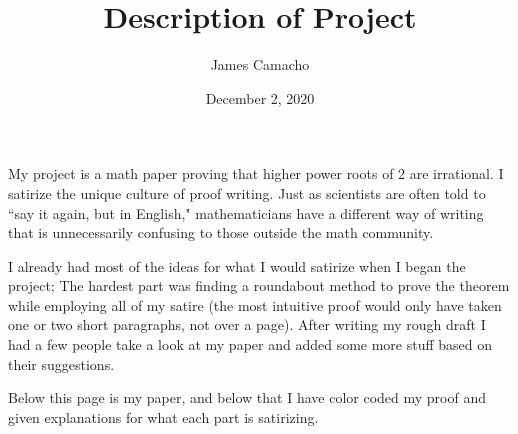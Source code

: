 \documentclass{article}
\author{James Camacho}
\title{Description of Project}
\date{December 2, 2020}
\begin{document}
	\maketitle
	\par
	My project is a math paper proving that higher power roots of $2$ are irrational. I satirize the unique culture of proof writing. Just as scientists are often told to ``say it again, but in English," mathematicians have a different way of writing that is unnecessarily confusing to those outside the math community.
	\par
	I already had most of the ideas for what I would satirize when I began the project; The hardest part was finding a roundabout method to prove the theorem while employing all of my satire (the most intuitive proof would only have taken one or two short paragraphs, not over a page). After writing my rough draft I had a few people take a look at my paper and added some more stuff based on their suggestions.
	\par Below this page is my paper, and below that I have color coded my proof and given explanations for what each part is satirizing.
	
\end{document}
